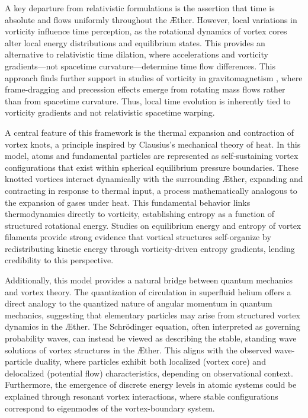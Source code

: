 \documentclass[a4paper,10pt]{article}
\begin{document}
    A key departure from relativistic formulations is the assertion that time is absolute and flows uniformly throughout the \AE ther. However, local variations in vorticity influence time perception, as the rotational dynamics of vortex cores alter local energy distributions and equilibrium states. This provides an alternative to relativistic time dilation, where accelerations and vorticity gradients—not spacetime curvature—determine time flow differences. This approach finds further support in studies of vorticity in gravitomagnetism \cite{cahill2005}, where frame-dragging and precession effects emerge from rotating mass flows rather than from spacetime curvature. Thus, local time evolution is inherently tied to vorticity gradients and not relativistic spacetime warping.

    A central feature of this framework is the thermal expansion and contraction of vortex knots, a principle inspired by Clausius’s mechanical theory of heat. In this model, atoms and fundamental particles are represented as self-sustaining vortex configurations that exist within spherical equilibrium pressure boundaries. These knotted vortices interact dynamically with the surrounding \AE ther, expanding and contracting in response to thermal input, a process mathematically analogous to the expansion of gases under heat. This fundamental behavior links thermodynamics directly to vorticity, establishing entropy as a function of structured rotational energy. Studies on equilibrium energy and entropy of vortex filaments \cite{belik2023} provide strong evidence that vortical structures self-organize by redistributing kinetic energy through vorticity-driven entropy gradients, lending credibility to this perspective.

    Additionally, this model provides a natural bridge between quantum mechanics and vortex theory. The quantization of circulation in superfluid helium offers a direct analogy to the quantized nature of angular momentum in quantum mechanics, suggesting that elementary particles may arise from structured vortex dynamics in the \AE ther. The Schrödinger equation, often interpreted as governing probability waves, can instead be viewed as describing the stable, standing wave solutions of vortex structures in the \AE ther. This aligns with the observed wave-particle duality, where particles exhibit both localized (vortex core) and delocalized (potential flow) characteristics, depending on observational context. Furthermore, the emergence of discrete energy levels in atomic systems could be explained through resonant vortex interactions, where stable configurations correspond to eigenmodes of the vortex-boundary system.
\end{document}
